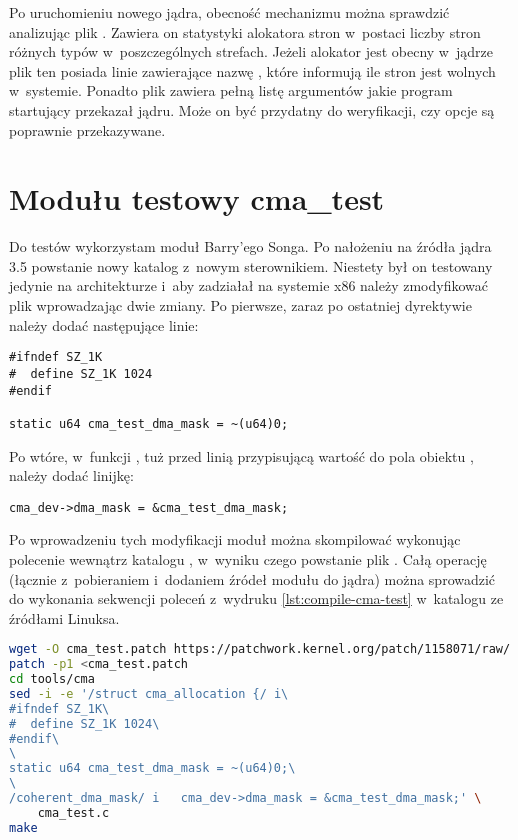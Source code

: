 Po uruchomieniu nowego jądra, obecność mechanizmu  można
sprawdzić analizując plik .  Zawiera on
statystyki alokatora stron w~postaci liczby stron różnych typów
w~poszczególnych strefach.  Jeżeli alokator  jest obecny
w~jądrze plik ten posiada linie zawierające nazwę , które
informują ile stron  jest wolnych w~systemie.  Ponadto plik
 zawiera pełną listę argumentów jakie program
startujący przekazał jądru.  Może on być przydatny do weryfikacji, czy
opcje są poprawnie przekazywane.


\section{Modułu testowy cma\_test}

Do testów  wykorzystam moduł Barry'ego Songa.  Po nałożeniu
\autocite{patch:cma-test} na źródła jądra 3.5 powstanie nowy katalog
 z~nowym sterownikiem.  Niestety był on testowany
jedynie na architekturze  i~aby zadziałał na systemie x86
należy zmodyfikować plik  wprowadzając dwie zmiany.
Po pierwsze, zaraz po ostatniej dyrektywie  należy
dodać następujące linie:

\begin{lstlisting}[numbers=none]
#ifndef SZ_1K
#  define SZ_1K 1024
#endif

static u64 cma_test_dma_mask = ~(u64)0;
\end{lstlisting}

Po wtóre, w~funkcji , tuż przed linią przypisującą
wartość do pola  obiektu ,
należy dodać linijkę:

\begin{lstlisting}[numbers=none]
	cma_dev->dma_mask = &cma_test_dma_mask;
\end{lstlisting}

Po wprowadzeniu tych modyfikacji moduł można skompilować wykonując
polecenie  wewnątrz katalogu , w~wyniku
czego powstanie plik .  Całą operację (łącznie
z~pobieraniem i~dodaniem źródeł modułu do jądra) można sprowadzić do
wykonania sekwencji poleceń z~wydruku \ref{lst:compile-cma-test}
w~katalogu ze źródłami Linuksa.

\begin{lstlisting}[float=tb,caption=Sekwencja komend dodająca
    i~budująca moduł \code{cma_test}.,
    label=lst:compile-cma-test,language=sh,numbers=none]
wget -O cma_test.patch https://patchwork.kernel.org/patch/1158071/raw/
patch -p1 <cma_test.patch
cd tools/cma
sed -i -e '/struct cma_allocation {/ i\
#ifndef SZ_1K\
#  define SZ_1K 1024\
#endif\
\
static u64 cma_test_dma_mask = ~(u64)0;\
\
/coherent_dma_mask/ i	cma_dev->dma_mask = &cma_test_dma_mask;' \
    cma_test.c
make
\end{lstlisting}

